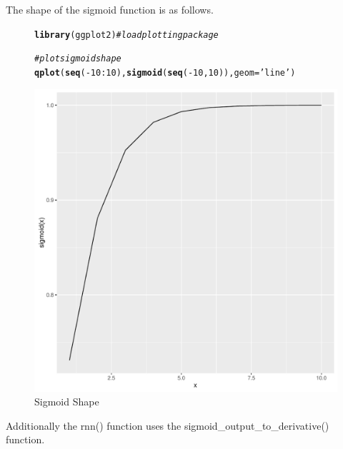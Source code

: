\documentclass[british]{article}\usepackage[]{graphicx}\usepackage[]{color}
\makeatletter
\def\maxwidth{ %
  \ifdim\Gin@nat@width>\linewidth
    \linewidth
  \else
    \Gin@nat@width
  \fi
}
\newcommand{\hlnum}[1]{\textcolor[rgb]{0.686,0.059,0.569}{#1}}%
\newcommand{\hlstr}[1]{\textcolor[rgb]{0.192,0.494,0.8}{#1}}%
\newcommand{\hlcom}[1]{\textcolor[rgb]{0.678,0.584,0.686}{\textit{#1}}}%
\newcommand{\hlopt}[1]{\textcolor[rgb]{0,0,0}{#1}}%
\newcommand{\hlstd}[1]{\textcolor[rgb]{0.345,0.345,0.345}{#1}}%
\newcommand{\hlkwc}[1]{\textcolor[rgb]{0.333,0.667,0.333}{#1}}%
\newcommand{\hlkwd}[1]{\textcolor[rgb]{0.737,0.353,0.396}{\textbf{#1}}}%
\newenvironment{kframe}{%
 \def\at@end@of@kframe{}%
 \ifinner\ifhmode%
  \def\at@end@of@kframe{\end{minipage}}%
  \begin{minipage}{\columnwidth}%
 \fi\fi%
 \def\FrameCommand##1{\hskip\@totalleftmargin \hskip-\fboxsep
 \colorbox{shadecolor}{##1}\hskip-\fboxsep
     \hskip-\linewidth \hskip-\@totalleftmargin \hskip\columnwidth}%
 \MakeFramed {\advance\hsize-\width
   \@totalleftmargin\z@ \linewidth\hsize
   \@setminipage}}%
 {\par\unskip\endMakeFramed%
 \at@end@of@kframe}
\newenvironment{knitrout}{}{} %
\makeatother
\begin{document}
The shape of the sigmoid function is as follows.

\begin{figure}[H]


\caption{Sigmoid Shape}


\begin{knitrout}
\color{fgcolor}\begin{kframe}
\begin{alltt}
\hlkwd{library}\hlstd{(ggplot2)} \hlcom{# load plotting package}

\hlcom{# plot sigmoid shape}
\hlkwd{qplot}\hlstd{(}\hlkwd{seq}\hlstd{(}\hlopt{-}\hlnum{10}\hlopt{:}\hlnum{10}\hlstd{),} \hlkwd{sigmoid}\hlstd{(}\hlkwd{seq}\hlstd{(}\hlopt{-}\hlnum{10}\hlstd{,}\hlnum{10}\hlstd{)),} \hlkwc{geom}\hlstd{=}\hlstr{'line'}\hlstd{)}
\end{alltt}
\end{kframe}
\includegraphics[width=\maxwidth]{figure/sigmoid_shape-1} 

\end{knitrout}

\end{figure}


Additionally the rnn() function uses the sigmoid\_output\_to\_derivative()
function.
\end{document}
